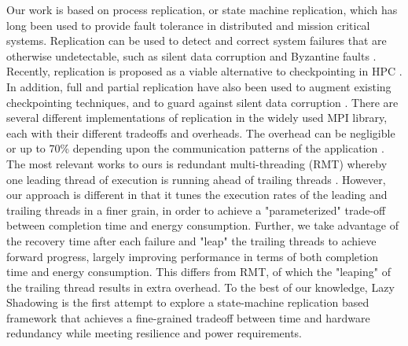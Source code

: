 Our work is based on process replication, or state machine replication, which has long been used to provide fault tolerance in distributed and mission critical systems\cite{schneider_1990_tutorial,bartlett_1981_nonstop}. Replication can be used to detect and correct system failures that are otherwise undetectable,
such as silent data corruption \cite{ni_2013_acr} and Byzantine faults \cite{fiala_2012_sdc}. Recently, replication is proposed as a
viable alternative to checkpointing in HPC \cite{riesen_sandia_2010,lefray_2013_rsd,Cappello:09:Fault}. 
In addition, full and partial
replication have also been used to augment existing checkpointing techniques, and to guard
against silent data corruption \cite{stearly_2012_partial,elliott_2012_cpr}. There are several different implementations of
replication in the widely used MPI library, each with their different tradeoffs and overheads. The
overhead can be negligible or up to 70\% depending upon the communication patterns of the
application \cite{engelmann2011redundant}. %
The most relevant works to ours is redundant multi-threading (RMT) whereby one leading thread of execution is running ahead of trailing threads \cite{reinhardt2000transient,Wadden:2014:RDE:2665671.2665686}. However, our approach is different in that it tunes the execution rates of the leading and trailing threads in a finer grain, in order to achieve a "parameterized" trade-off between completion time and energy consumption. Further, we take advantage of the recovery time after each failure and "leap" the trailing threads to achieve forward progress, largely improving performance in terms of both completion time and energy consumption. This differs from RMT, of which the "leaping" of the trailing thread results in extra overhead.
To the best of our knowledge,
Lazy Shadowing is the first attempt to explore a state-machine replication based framework
that achieves a fine-grained tradeoff between time and hardware redundancy while meeting resilience and
power requirements.